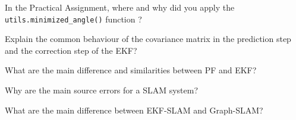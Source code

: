 \documentclass[final]{lcc}
\begin{document}
\maketitle




\ejercicio In the Practical Assignment, where and why did you apply the \lstinline[style=python]{utils.minimized_angle()} function ?


\ejercicio Explain the common behaviour of the covariance matrix in the prediction step and the correction step of the EKF?

\ejercicio What are the main difference and similarities between PF and EKF?





\ejercicio Why are the main source errors for a SLAM system?

\ejercicio What are the main difference between EKF-SLAM and Graph-SLAM?


\ejercicio 
\end{document}
